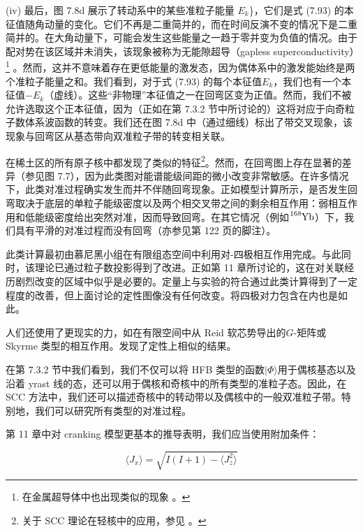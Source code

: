 \noindent (iv) 最后，图 7.8d 展示了转动系中的某些准粒子能量 $E_{k}$\}，它们是式 (7.93) 的本征值随角动量的变化。它们不再是二重简并的，而在时间反演不变的情况下是二重简并的。在大角动量下，可能会发生这些能量之一趋于零并变为负值的情况。由于配对势在该区域并未消失，该现象被称为无能隙超导（gapless
superconductivity）\footnote{在金属超导体中也出现类似的现象 \cite{AG61}。}
\cite{GLS67,Gr74,CMR75}。然而，这并不意味着存在更低能量的激发态，因为偶体系中的激发能始终是两个准粒子能量之和。我们看到，对于式
(7.93) 的每个本征值$E_{k}$，我们也有一个本征值$-E_{k}$（虚线）。这些“非物理”本征值之一在回弯区变为正值。然而，我们不被允许选取这个正本征值，因为（正如在第
7.3.2 节中所讨论的）这将对应于向奇粒子数体系波函数的转变。我们还在图 7.8d 中（通过细线）标出了带交叉现象，该现象与回弯区从基态带向双准粒子带的转变相关联。

在稀土区的所有原子核中都发现了类似的特征\footnote{关于 SCC 理论在轻核中的应用，参见 \cite{PM76,NS78,Zi78}。}。然而，在回弯图上存在显著的差异（参见图
7.7），因为此类图对能谱能级间距的微小改变非常敏感。在许多情况下，此类对准过程确实发生而并不伴随回弯现象。正如模型计算\cite{CMR75}所示，是否发生回弯取决于底层的单粒子能级密度以及两个相交叉带之间的剩余相互作用：弱相互作用和低能级密度给出突然对准，因而导致回弯。在其它情况（例如$\ce{^{168}Yb}$）下，我们具有平滑的对准过程而没有回弯（亦参见第
122 页的脚注）。

此类计算最初由慕尼黑小组\cite{BMR73}在有限组态空间中利用对-四极相互作用完成。与此同时，该理论已通过粒子数投影得到了改进\cite{DBM73,FDG76}。正如第
11 章所讨论的，这在对关联经历剧烈改变的区域中似乎是必要的。定量上与实验的符合通过此类计算得到了一定程度的改善，但上面讨论的定性图像没有任何改变。将四极对力包含在内也是如此\cite{WF78a}。

人们还使用了更现实的力，如在有限空间中从 Reid 软芯势导出的$G$-矩阵\cite{GVS76,Go76a}或 Skyrme
类型的相互作用\cite{FMR79}。发现了定性上相似的结果。

在第 7.3.2 节中我们看到，我们不仅可以将 HFB 类型的函数$|\Phi\rangle$用于偶核基态以及沿着 yrast 线的态，还可以用于偶核和奇核中的所有类型的准粒子态。因此，在
SCC 方法中，我们还可以描述奇核中的转动带以及偶核中的一般双准粒子带。特别地，我们可以研究所有类型的对准过程。

第 11 章中对 cranking 模型更基本的推导表明，我们应当使用附加条件：

\begin{equation}
\langle J_{x}\rangle=\sqrt{I(I+1)-\langle J^{2}_{z}\rangle}\label{eq:cranking_condition_exact_projection}
\end{equation}

